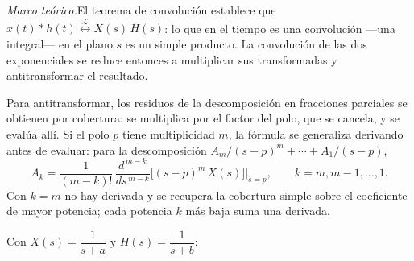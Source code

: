 \documentclass[10pt,a4paper]{article}
\newcommand{\teoria}[1]{\noindent\textit{Marco teórico.}\enspace #1\par\smallskip}
\begin{document}
\teoria{El teorema de convolución establece que
$x(t)*h(t)\overset{\mathcal{L}}{\longleftrightarrow}X(s)\,H(s)$: lo que en el
tiempo es una convolución ---una integral--- en el plano $s$ es un simple
producto. La convolución de las dos exponenciales se reduce entonces a
multiplicar sus transformadas y antitransformar el resultado.

Para antitransformar, los residuos de la descomposición en fracciones
parciales se obtienen por cobertura: se multiplica por el factor del polo,
que se cancela, y se evalúa allí. Si el polo $p$ tiene multiplicidad $m$, la
fórmula se generaliza derivando antes de evaluar: para la descomposición
$A_m/(s-p)^m+\cdots+A_1/(s-p)$,
\[
	A_k=\frac{1}{(m-k)!}\,\frac{d^{\,m-k}}{ds^{\,m-k}}\bigl[(s-p)^m\,X(s)\bigr]\bigg|_{s=p},
	\qquad k=m,m-1,\ldots,1.
\]
Con $k=m$ no hay derivada y se recupera la cobertura simple sobre el
coeficiente de mayor potencia; cada potencia $k$ más baja suma una
derivada.}

Con $X(s)=\dfrac{1}{s+a}$ y $H(s)=\dfrac{1}{s+b}$:
\end{document}
